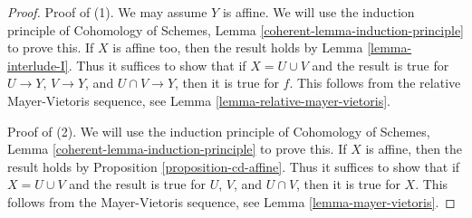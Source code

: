 \documentclass[10pt,a4paper]{amsart}
\theoremstyle{plain}
\theoremstyle{definition}
\theoremstyle{remark}
\numberwithin{equation}{subsection}
\begin{document}
\begin{proof}
Proof of (1). We may assume $Y$ is affine. We will use the
induction principle of 
Cohomology of Schemes, Lemma \ref{coherent-lemma-induction-principle}
to prove this. If $X$ is affine too, then the result holds by
Lemma \ref{lemma-interlude-I}. Thus it suffices to show that if
$X = U \cup V$ and the result is true for $U \to Y$, $V \to Y$, and
$U \cap V \to Y$, then it is true for $f$. This follows from the
relative Mayer-Vietoris sequence, see
Lemma \ref{lemma-relative-mayer-vietoris}.

\medskip\noindent
Proof of (2). We will use the induction principle of
Cohomology of Schemes, Lemma \ref{coherent-lemma-induction-principle}
to prove this. If $X$ is affine, then the result holds by
Proposition \ref{proposition-cd-affine}. Thus it suffices to show that if
$X = U \cup V$ and the result is true for $U$, $V$, and
$U \cap V $, then it is true for $X$. This follows from the
Mayer-Vietoris sequence, see
Lemma \ref{lemma-mayer-vietoris}.
\end{proof}
\end{document}
